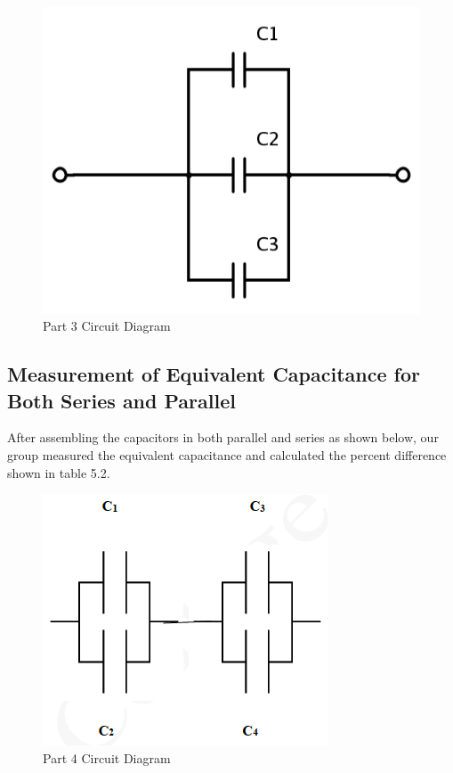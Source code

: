 \documentclass[titlepage]{article}
\begin{document}
        \begin{figure}[hbt!] 
            \centering
            \caption*{Part 3 Circuit Diagram}
            \includegraphics[scale=0.5]{images/procedure/part3.png}
        \end{figure} 



        \FloatBarrier
        \subsection{Measurement of Equivalent Capacitance for Both Series and Parallel}
        After assembling the capacitors in both parallel and series as shown below, our group measured the equivalent capacitance and calculated the percent difference shown in table 5.2.

        \begin{figure}[hbt!] 
            \centering
            \caption*{Part 4 Circuit Diagram}
            \includegraphics[scale=0.7]{images/procedure/part4.png}
        \end{figure} 
\end{document}
